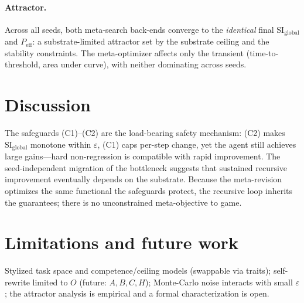 \documentclass[11pt]{article}
\newcommand{\SI}{\mathrm{SI}_{\text{global}}}
\newcommand{\Peff}{P_{\text{eff}}}
\begin{document}
\paragraph{Attractor.} Across all seeds, both meta-search back-ends converge to
the \emph{identical} final $\SI$ and $\Peff$: a substrate-limited attractor set
by the substrate ceiling and the stability constraints. The meta-optimizer
affects only the transient (time-to-threshold, area under curve), with neither
dominating across seeds.

\section{Discussion}
The safeguards (C1)--(C2) are the load-bearing safety mechanism: (C2) makes
$\SI$ monotone within $\varepsilon$, (C1) caps per-step change, yet the agent
still achieves large gains---hard non-regression is compatible with rapid
improvement. The seed-independent migration of the bottleneck suggests that
sustained recursive improvement eventually depends on the substrate. Because the
meta-revision optimizes the same functional the safeguards protect, the
recursive loop inherits the guarantees; there is no unconstrained meta-objective
to game.

\section{Limitations and future work}
Stylized task space and competence/ceiling models (swappable via traits);
self-rewrite limited to $O$ (future: $A,B,C,H$); Monte-Carlo noise interacts
with small $\varepsilon$; the attractor analysis is empirical and a formal
characterization is open.
\end{document}
